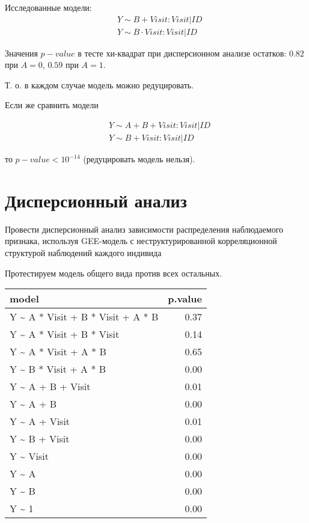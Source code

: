 \documentclass[a4paper,12pt]{article}
\begin{document}
Исследованные модели:
\begin{align*}
    & Y \sim B + Visit : Visit | ID \\
    & Y \sim B \cdot Visit : Visit | ID
\end{align*}

Значения $ p-value $ в тесте хи-квадрат при дисперсионном анализе остатков:
$ 0.82 $ при $ A = 0 $, $ 0.59 $ при $ A = 1 $.

Т. о. в каждом случае модель можно редуцировать.

Если же сравнить модели

\begin{align*}
    & Y \sim A + B + Visit : Visit | ID \\
    & Y \sim B  + Visit : Visit | ID
\end{align*}

то $ p-value < 10^{-14} $ (редуцировать модель нельзя).

\section{ Дисперсионный анализ }
\label{section:anova}

\begin{leftbar}
Провести дисперсионный анализ зависимости распределения наблюдаемого признака, используя GEE-модель с неструктурированной корреляционной структурой наблюдений каждого индивида
\end{leftbar}

Протестируем модель общего вида против всех остальных.

\begin{table}[H]
    \centering
    \begin{tabular}{lr}
        \hline
        model & p.value \\
        \hline
        Y \~{} A * Visit + B * Visit + A * B & 0.37 \\
        Y \~{} A * Visit + B * Visit & 0.14 \\
        Y \~{} A * Visit + A * B & 0.65 \\
        Y \~{} B * Visit + A * B & 0.00 \\
        Y \~{} A + B + Visit & 0.01 \\
        Y \~{} A + B & 0.00 \\
        Y \~{} A + Visit & 0.01 \\
        Y \~{} B + Visit & 0.00 \\
        Y \~{} Visit & 0.00 \\
        Y \~{} A & 0.00 \\
        Y \~{} B & 0.00 \\
        Y \~{} 1 & 0.00 \\
        \hline
    \end{tabular}
\end{table}
\end{document}
